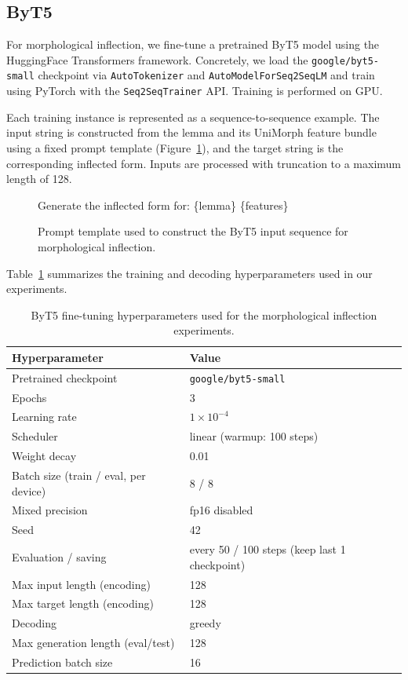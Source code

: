 \subsection{ByT5}

For morphological inflection, we fine-tune a pretrained ByT5 model using the HuggingFace Transformers framework. Concretely, we load the \texttt{google/byt5-small} checkpoint via \texttt{AutoTokenizer} and \texttt{AutoModelForSeq2SeqLM} and train using PyTorch with the \texttt{Seq2SeqTrainer} API. Training is performed on GPU.

Each training instance is represented as a sequence-to-sequence example. The input string is constructed from the lemma and its UniMorph feature bundle using a fixed prompt template (Figure~\ref{fig:byt5_forward_prompt}), and the target string is the corresponding inflected form. Inputs are processed with truncation to a maximum length of 128.

\begin{figure}[h]
\centering
\begin{minipage}{0.9\linewidth}
\small\ttfamily
Generate the inflected form for: \{lemma\} \{features\}
\end{minipage}
\caption{Prompt template used to construct the ByT5 input sequence for morphological inflection.}
\label{fig:byt5_forward_prompt}
\end{figure}

Table~\ref{tab:byt5_hyperparameters} summarizes the training and decoding hyperparameters used in our experiments.

\begin{table}[h]
\centering
\begin{tabular}{ll}
\toprule
Hyperparameter & Value \\
\midrule
Pretrained checkpoint & \texttt{google/byt5-small} \\
Epochs & 3 \\
Learning rate & $1\times 10^{-4}$ \\
Scheduler & linear (warmup: 100 steps) \\
Weight decay & 0.01 \\
Batch size (train / eval, per device) & 8 / 8 \\
Mixed precision & fp16 disabled \\
Seed & 42 \\
Evaluation / saving & every 50 / 100 steps (keep last 1 checkpoint) \\
Max input length (encoding) & 128 \\
Max target length (encoding) & 128 \\
Decoding & greedy \\
Max generation length (eval/test) & 128 \\
Prediction batch size & 16 \\
\bottomrule
\end{tabular}
\caption{ByT5 fine-tuning hyperparameters used for the morphological inflection experiments.}
\label{tab:byt5_hyperparameters}
\end{table}

